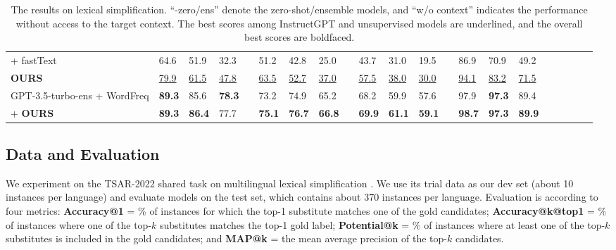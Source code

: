 \documentclass[11pt]{article}
\begin{document}
\begin{table*}[t!]
\begin{center}
\begin{adjustbox}{max width=\textwidth}
\begin{tabular}{lllllllllllllllllllll}
\citet{wada-etal-2022-unsupervised} + fastText
&64.6&51.9&32.3&&51.2&42.8&25.0&&43.7&31.0&19.5&&86.9&70.9&49.2\\

\textbf{OURS}
&\underline{79.9}&\underline{61.5}&\underline{47.8}&&\underline{63.5}&\underline{52.7}&\underline{37.0}&&\underline{57.5}&\underline{38.0}&\underline{30.0}&&\underline{94.1}&\underline{83.2}&\underline{71.5}

\\\midrule\midrule



GPT-3.5-turbo-ens + WordFreq
&\textbf{89.3}&85.6&\textbf{78.3}&&73.2&74.9&65.2&&68.2&59.9&57.6&&97.9&\textbf{97.3}&89.4
\\


+ \textbf{OURS}
&\textbf{89.3}&\textbf{86.4}&77.7&&\textbf{75.1}&\textbf{76.7}&\textbf{66.8}&&\textbf{69.9}&\textbf{61.1}&\textbf{59.1}&&\textbf{98.7}&\textbf{97.3}&\textbf{89.9}\\


\bottomrule
\end{tabular}
\end{adjustbox}
\end{center}
\caption{The results on lexical simplification. ``-zero/ens'' denote the zero-shot/ensemble models, and ``w/o context'' indicates the performance without access to the target context. The best scores among InstructGPT and unsupervised models are underlined, and the overall best scores are boldfaced.}
\label{result_tsar}
\end{table*}
 
\subsection{Data and Evaluation}
We experiment on the TSAR-2022 shared task on multilingual lexical simplification \cite{saggion-etal-2022-findings,10.3389/frai.2022.991242,ferres-saggion-2022-alexsis,north-etal-2022-alexsis}. We use its trial data as our dev set (about 10 instances per language) and evaluate models on the test set, which contains about 370 instances per language. Evaluation is according to four metrics: \textbf{Accuracy@1} = \% of instances for which the top-1 substitute matches one of the gold candidates; \textbf{Accuracy@k@top1} = \% of instances where one of the top-$k$ substitutes matches the top-1 gold label; \textbf{Potential@k} = \% of instances where at least one of the top-$k$ substitutes is included in the gold candidates; and \textbf{MAP@k} = the mean average precision of the top-$k$ candidates. 
\end{document}
